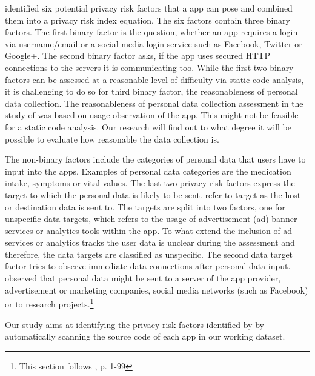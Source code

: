 \documentclass[
	a4paper,
	oneside,
	12pt,
	liststotocnumbered
]{article}
\let\cite\textcite
\begin{document}
\cite{Bruggemann2016} identified six potential privacy risk factors that a \mH app can pose and combined them into a privacy risk index equation. 
The six factors contain three binary factors.
The first binary factor is the question, whether an app requires a login via username/email or a social media login service such as Facebook, Twitter or Google+. 
The second binary factor asks, if the app uses secured \acs{HTTP} connections to the servers it is communicating too.
While the first two binary factors can be assessed at a reasonable level of difficulty via static code analysis, it is challenging to do so for third binary factor, the reasonableness of personal data collection. 
The reasonableness of personal data collection assessment in the study of \cite{Bruggemann2016} was based on usage observation of the app. This might not be feasible for a static code analysis. 
Our research will find out to what degree it will be possible to evaluate how reasonable the data collection is.

The non-binary factors include the categories of personal data that users have to input into the \mH apps. Examples of personal data categories are the medication intake, symptoms or vital values.
The last two privacy risk factors express the target to which the personal data is likely to be sent. 
\cite{Bruggemann2016} refer to target as the host or destination data is sent to.
The targets are split into two factors, one for unspecific data targets, which refers to the usage of advertisement (ad) banner services or analytics tools within the app. 
To what extend the inclusion of ad services or analytics tracks the user data is unclear during the assessment and therefore, the data targets are classified as unspecific.
The second data target factor tries to observe immediate data connections after personal data input. 
\cite{Bruggemann2016} observed that personal data might be sent to a server of the app provider, advertisement or marketing companies, social media networks (such as Facebook) or to research projects.\footnote{This section follows \cite{Bruggemann2016}, p. 1-99}

Our study aims at identifying the privacy risk factors identified by \cite{Bruggemann2016} by automatically scanning the source code of each app in our working dataset. 
\end{document}
